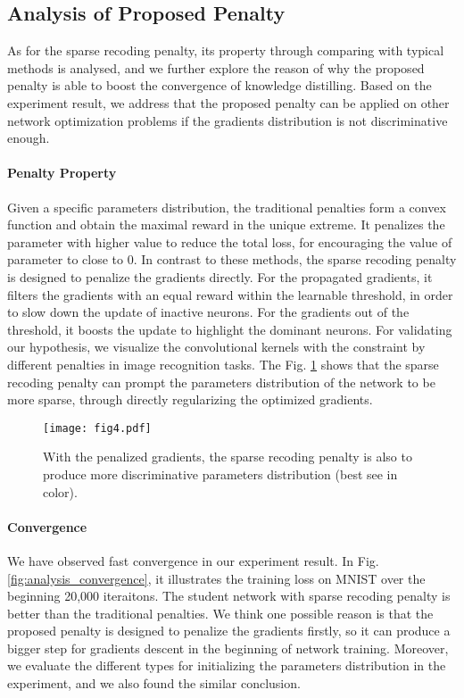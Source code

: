 \documentclass[10pt,twocolumn,letterpaper]{article}
\begin{document}
\subsection{Analysis of Proposed Penalty}\label{sec_penalty_analysis}
As for the sparse recoding penalty,
its property through comparing with typical methods is analysed,
and we further explore the reason of why the proposed penalty is able to boost
the convergence of knowledge distilling.
Based on the experiment result,
we address that
the proposed penalty can be applied on
other network optimization problems
if the gradients distribution is not discriminative enough.

\paragraph{Penalty Property}
Given a specific parameters distribution,
the traditional penalties \cite{wen2016learning, zhang2016l1} form a convex function
and obtain the maximal reward in the unique extreme.
It penalizes the parameter with higher value to reduce the total loss,
for encouraging the value of parameter to close to 0.
In contrast to these methods,
the sparse recoding penalty is designed to penalize the gradients directly.
For the propagated gradients,
it filters the gradients with an equal reward within the learnable threshold,
in order to slow down the update of inactive neurons.
For the gradients out of the threshold,
it boosts the update to highlight the dominant neurons.
For validating our hypothesis,
we visualize the convolutional kernels with the constraint
by different penalties in image recognition tasks.
The Fig. \ref{fig:kernel-analysis} shows that the sparse recoding penalty
can prompt the parameters distribution of the network to be more sparse,
through directly regularizing the optimized gradients.

\begin{figure}[ht]
  \centering
  \texttt{[image: fig4.pdf]}
  \caption{With the penalized gradients, the sparse recoding penalty is also to produce
  more discriminative parameters distribution (best see in color).}
  \label{fig:kernel-analysis}
\end{figure}

\paragraph{Convergence}
We have observed fast convergence in our experiment result.
In Fig. \ref{fig:analysis_convergence},
it illustrates the training loss on MNIST over the beginning 20,000 iteraitons.
The student network with sparse recoding penalty
is better than the traditional penalties.
We think one possible reason is that
the proposed penalty is designed to penalize the gradients firstly,
so it can produce a bigger step for gradients descent
in the beginning of network training.
Moreover,
we evaluate the different types for initializing the parameters distribution in the experiment,
and we also found the similar conclusion.
\end{document}
